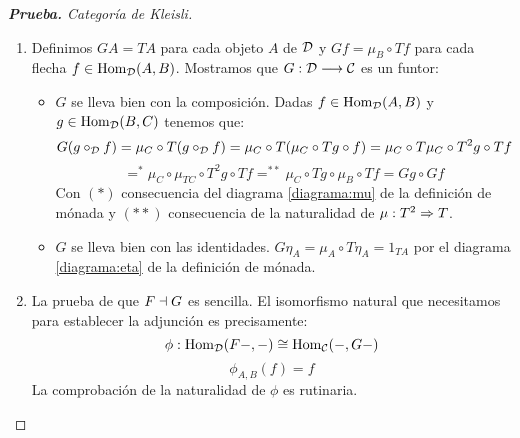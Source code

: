 \begin{proof}[\textbf{Prueba. } Categoría de Kleisli]
\begin{enumerate}
  \item Definimos $GA = TA$ para cada objeto $A$ de $\mathcal{D}$
    y $Gf = \mu_B \circ Tf$ para cada flecha $f \in \operatorname{Hom}_{\mathcal{D}}(A, B)$.
    Mostramos que $G: \mathcal{D}\longrightarrow \mathcal{C}$ es un funtor:
    \begin{itemize}
    \item $G$ se lleva bien con la composición. Dadas $f \in \operatorname{Hom}_{\mathcal{D}}(A, B)$
      y $g \in \operatorname{Hom}_{\mathcal{D}}(B, C)$ tenemos que:
      $$G(g \circ_{\mathcal{D}} f) = \mu_C \circ T(g \circ_{\mathcal{D}} f)
      = \mu_C \circ T(\mu_C \circ Tg \circ f)
      = \mu_C \circ T\mu_C \circ T^2g \circ Tf$$
      $$=^* \mu_C \circ \mu_{TC} \circ T^2g \circ Tf
      =^{**} \mu_C \circ Tg \circ \mu_B \circ Tf
      = Gg \circ Gf$$
      Con $(*)$ consecuencia del diagrama \eqref{diagrama:mu}
      de la definición de mónada y $(**)$ consecuencia de la
      naturalidad de $\mu : T^2\Rightarrow T$.
    \item $G$ se lleva bien con las identidades.
      $G\eta_A = \mu_A \circ T\eta_A = 1_{TA}$
      por el diagrama \eqref{diagrama:eta} de la definición de mónada.
    \end{itemize}
  \item La prueba de que $F \dashv G$ es sencilla.
    El isomorfismo natural que necesitamos para establecer la
    adjunción es precisamente:
    $$\phi : \operatorname{Hom}_{\mathcal{D}}(F-, -) \cong \operatorname{Hom}_{\mathcal{C}}(-, G-)$$
    $$\phi_{A, B}(f) = f$$
    La comprobación de la naturalidad de $\phi$ es rutinaria.

  \end{enumerate}
\end{proof}

